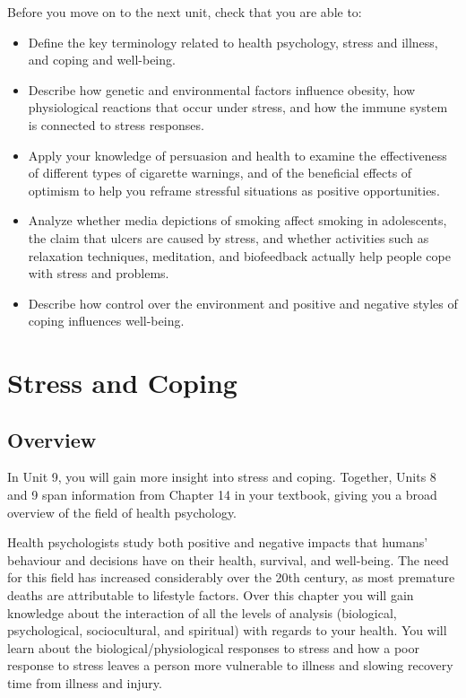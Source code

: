 \documentclass[
]{book}
\begin{document}
\begin{progress}
Before you move on to the next unit, check that you are able to:

\begin{itemize}
\item
  Define the key terminology related to health psychology, stress and illness, and coping and well-being.
\item
  Describe how genetic and environmental factors influence obesity, how physiological reactions that occur under stress, and how the immune system is connected to stress responses.
\item
  Apply your knowledge of persuasion and health to examine the effectiveness of different types of cigarette warnings, and of the beneficial effects of optimism to help you reframe stressful situations as positive opportunities.
\item
  Analyze whether media depictions of smoking affect smoking in adolescents, the claim that ulcers are caused by stress, and whether activities such as relaxation techniques, meditation, and biofeedback actually help people cope with stress and problems.
\item
  Describe how control over the environment and positive and negative styles of coping influences well-being.
\end{itemize}
\end{progress}

\hypertarget{stress-and-coping}{%
\chapter{Stress and Coping}\label{stress-and-coping}}

\hypertarget{overview-7}{%
\section*{Overview}\label{overview-7}}

In Unit 9, you will gain more insight into stress and coping. Together, Units 8 and 9 span information from Chapter 14 in your textbook, giving you a broad overview of the field of health psychology.

Health psychologists study both positive and negative impacts that humans' behaviour and decisions have on their health, survival, and well-being. The need for this field has increased considerably over the 20th century, as most premature deaths are attributable to lifestyle factors. Over this chapter you will gain knowledge about the interaction of all the levels of analysis (biological, psychological, sociocultural, and spiritual) with regards to your health. You will learn about the biological/physiological responses to stress and how a poor response to stress leaves a person more vulnerable to illness and slowing recovery time from illness and injury.
\end{document}
